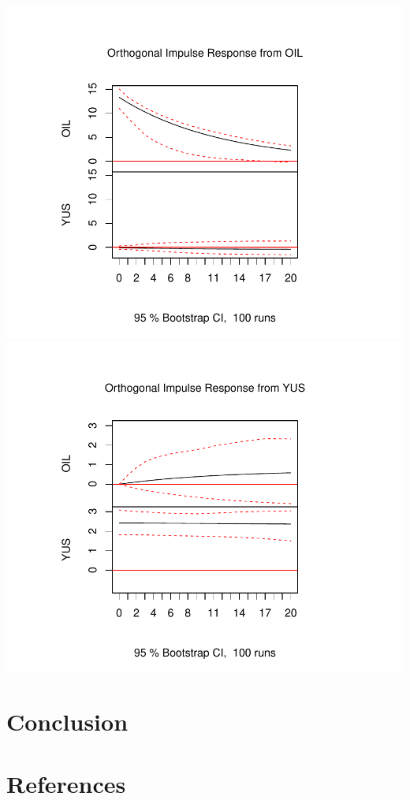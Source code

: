 \documentclass[11pt,preprint, authoryear]{elsarticle}
\numberwithin{equation}{section}
\numberwithin{figure}{section}
\numberwithin{table}{section}
\begin{document}
\includegraphics{replication_files/figure-latex/unnamed-chunk-7-1.pdf}
\includegraphics{replication_files/figure-latex/unnamed-chunk-7-2.pdf}

\hypertarget{conclusion}{%
\section{Conclusion}\label{conclusion}}

\newpage

\hypertarget{references}{%
\section*{References}\label{references}}
\end{document}
